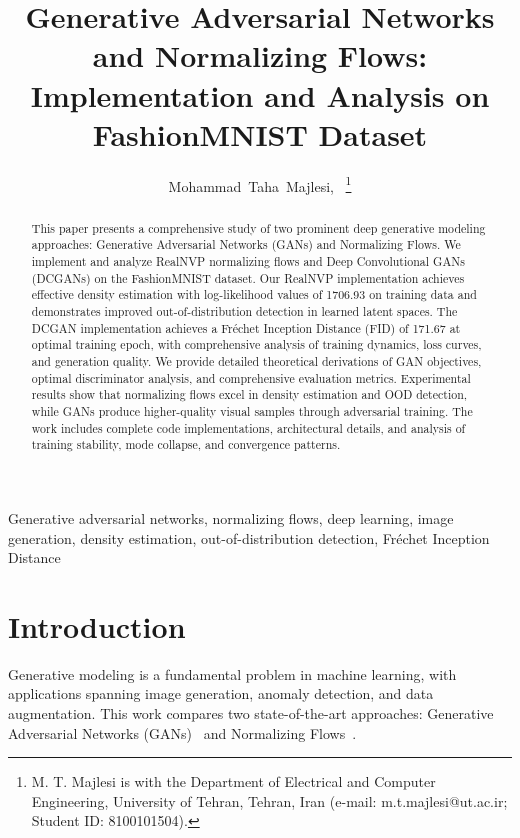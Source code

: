 \documentclass[conference,12pt]{IEEEtran}
\begin{document}
\title{Generative Adversarial Networks and Normalizing Flows:\\
Implementation and Analysis on FashionMNIST Dataset}

\author{Mohammad~Taha~Majlesi,~
\thanks{M. T. Majlesi is with the Department of Electrical and Computer Engineering, University of Tehran, Tehran, Iran (e-mail: m.t.majlesi@ut.ac.ir; Student ID: 8100101504).}}

\maketitle

\begin{abstract}
This paper presents a comprehensive study of two prominent deep generative modeling approaches: Generative Adversarial Networks (GANs) and Normalizing Flows. We implement and analyze RealNVP normalizing flows and Deep Convolutional GANs (DCGANs) on the FashionMNIST dataset. Our RealNVP implementation achieves effective density estimation with log-likelihood values of 1706.93 on training data and demonstrates improved out-of-distribution detection in learned latent spaces. The DCGAN implementation achieves a Fréchet Inception Distance (FID) of 171.67 at optimal training epoch, with comprehensive analysis of training dynamics, loss curves, and generation quality. We provide detailed theoretical derivations of GAN objectives, optimal discriminator analysis, and comprehensive evaluation metrics. Experimental results show that normalizing flows excel in density estimation and OOD detection, while GANs produce higher-quality visual samples through adversarial training. The work includes complete code implementations, architectural details, and analysis of training stability, mode collapse, and convergence patterns.
\end{abstract}

\begin{IEEEkeywords}
Generative adversarial networks, normalizing flows, deep learning, image generation, density estimation, out-of-distribution detection, Fréchet Inception Distance
\end{IEEEkeywords}

\section{Introduction}

Generative modeling is a fundamental problem in machine learning, with applications spanning image generation, anomaly detection, and data augmentation. This work compares two state-of-the-art approaches: Generative Adversarial Networks (GANs)~\cite{goodfellow2014generative} and Normalizing Flows~\cite{dinh2017density}.
\end{document}

